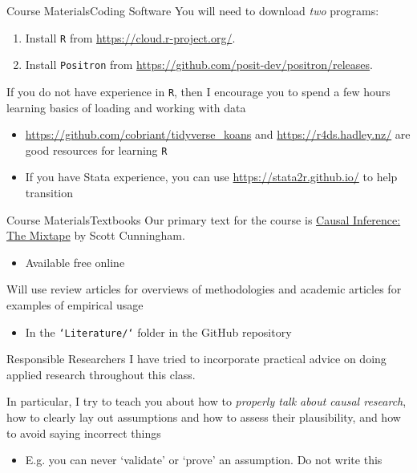 \documentclass[aspectratio=169,t,11pt,table]{beamer}
\begin{document}
\begin{frame}{Course Materials}{Coding Software}
  You will need to download \emph{two} programs:
  \begin{enumerate}
    \item Install \texttt{R} from \url{https://cloud.r-project.org/}.
    \item Install \texttt{Positron} from \url{https://github.com/posit-dev/positron/releases}. 
  \end{enumerate}

  \bigskip
  If you do not have experience in \texttt{R}, then I encourage you to spend a few hours learning basics of loading and working with data
  \begin{itemize}
    \item \url{https://github.com/cobriant/tidyverse_koans} and \url{https://r4ds.hadley.nz/} are good resources for learning \texttt{R}
    \item If you have Stata experience, you can use \url{https://stata2r.github.io/} to help transition
  \end{itemize}
\end{frame}

\begin{frame}{Course Materials}{Textbooks}
  Our primary text for the course is \href{https://mixtape.scunning.com/}{Causal Inference: The Mixtape} by Scott Cunningham. 
  \begin{itemize}
    \item Available free online
  \end{itemize}
  
  \bigskip
  Will use review articles for overviews of methodologies and academic articles for examples of empirical usage
  \begin{itemize}
    \item In the \texttt{`Literature/`} folder in the GitHub repository
  \end{itemize} 
\end{frame}

\begin{frame}{Responsible Researchers}
  I have tried to incorporate practical advice on doing applied research throughout this class. 
  
  \bigskip
  In particular, I try to teach you about how to \emph{properly talk about causal research},  how to clearly lay out assumptions and how to assess their plausibility, and how to avoid saying incorrect things
  \begin{itemize}
    \item E.g. you can never `validate' or `prove' an assumption. \alert{Do not write this}
  \end{itemize}
\end{frame}
\end{document}
